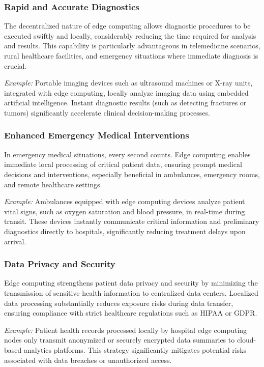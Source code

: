 \documentclass[runningheads]{llncs}
\begin{document}
\subsubsection{Rapid and Accurate Diagnostics}
The decentralized nature of edge computing allows diagnostic procedures to be executed swiftly and locally, considerably reducing the time required for analysis and results. This capability is particularly advantageous in telemedicine scenarios, rural healthcare facilities, and emergency situations where immediate diagnosis is crucial.

\textit{Example:} Portable imaging devices such as ultrasound machines or X-ray units, integrated with edge computing, locally analyze imaging data using embedded artificial intelligence. Instant diagnostic results (such as detecting fractures or tumors) significantly accelerate clinical decision-making processes.

\subsubsection{Enhanced Emergency Medical Interventions}
In emergency medical situations, every second counts. Edge computing enables immediate local processing of critical patient data, ensuring prompt medical decisions and interventions, especially beneficial in ambulances, emergency rooms, and remote healthcare settings.

\textit{Example:} Ambulances equipped with edge computing devices analyze patient vital signs, such as oxygen saturation and blood pressure, in real-time during transit. These devices instantly communicate critical information and preliminary diagnostics directly to hospitals, significantly reducing treatment delays upon arrival.

\subsubsection{Data Privacy and Security}
Edge computing strengthens patient data privacy and security by minimizing the transmission of sensitive health information to centralized data centers. Localized data processing substantially reduces exposure risks during data transfer, ensuring compliance with strict healthcare regulations such as HIPAA or GDPR.

\textit{Example:} Patient health records processed locally by hospital edge computing nodes only transmit anonymized or securely encrypted data summaries to cloud-based analytics platforms. This strategy significantly mitigates potential risks associated with data breaches or unauthorized access.
\end{document}

